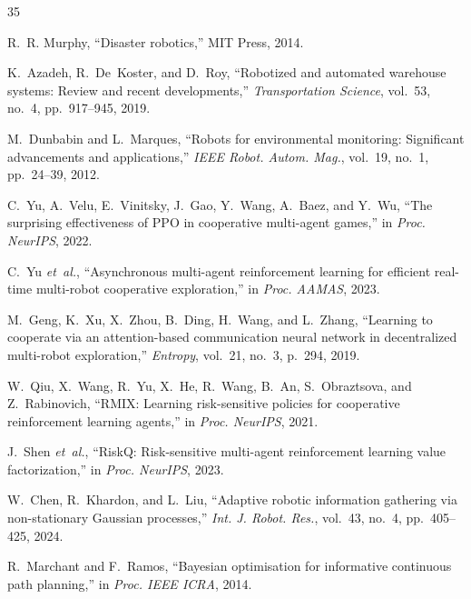 \documentclass[letterpaper]{IEEEtran}
\begin{document}

% 

\begin{thebibliography}{35}

R.~R. Murphy, ``Disaster robotics,'' MIT Press, 2014.

K.~Azadeh, R.~De~Koster, and D.~Roy, ``Robotized and automated warehouse systems: Review and recent developments,'' \emph{Transportation Science}, vol.~53, no.~4, pp.~917--945, 2019.

M.~Dunbabin and L.~Marques, ``Robots for environmental monitoring: Significant advancements and applications,'' \emph{IEEE Robot. Autom. Mag.}, vol.~19, no.~1, pp.~24--39, 2012.

C.~Yu, A.~Velu, E.~Vinitsky, J.~Gao, Y.~Wang, A.~Baez, and Y.~Wu, ``The surprising effectiveness of PPO in cooperative multi-agent games,'' in \emph{Proc. NeurIPS}, 2022.

C.~Yu \emph{et~al.}, ``Asynchronous multi-agent reinforcement learning for efficient real-time multi-robot cooperative exploration,'' in \emph{Proc. AAMAS}, 2023.

M.~Geng, K.~Xu, X.~Zhou, B.~Ding, H.~Wang, and L.~Zhang, ``Learning to cooperate via an attention-based communication neural network in decentralized multi-robot exploration,'' \emph{Entropy}, vol.~21, no.~3, p.~294, 2019.

W.~Qiu, X.~Wang, R.~Yu, X.~He, R.~Wang, B.~An, S.~Obraztsova, and Z.~Rabinovich, ``RMIX: Learning risk-sensitive policies for cooperative reinforcement learning agents,'' in \emph{Proc. NeurIPS}, 2021.

J.~Shen \emph{et~al.}, ``RiskQ: Risk-sensitive multi-agent reinforcement learning value factorization,'' in \emph{Proc. NeurIPS}, 2023.

W.~Chen, R.~Khardon, and L.~Liu, ``Adaptive robotic information gathering via non-stationary Gaussian processes,'' \emph{Int. J. Robot. Res.}, vol.~43, no.~4, pp.~405--425, 2024.

R.~Marchant and F.~Ramos, ``Bayesian optimisation for informative continuous path planning,'' in \emph{Proc. IEEE ICRA}, 2014.


\end{thebibliography}
\end{document}
